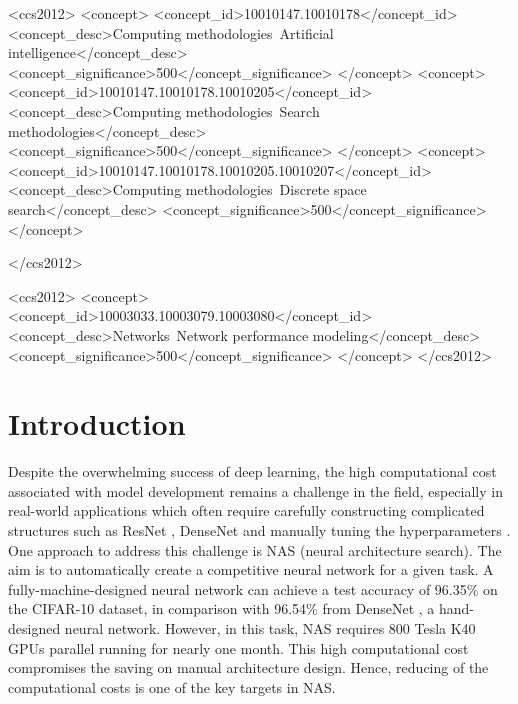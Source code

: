 \documentclass[sigconf]{acmart}
\begin{document}
\begin{CCSXML}
<ccs2012>
<concept>
<concept_id>10010147.10010178</concept_id>
<concept_desc>Computing methodologies~Artificial intelligence</concept_desc>
<concept_significance>500</concept_significance>
</concept>
<concept>
<concept_id>10010147.10010178.10010205</concept_id>
<concept_desc>Computing methodologies~Search methodologies</concept_desc>
<concept_significance>500</concept_significance>
</concept>
<concept>
<concept_id>10010147.10010178.10010205.10010207</concept_id>
<concept_desc>Computing methodologies~Discrete space search</concept_desc>
<concept_significance>500</concept_significance>
</concept>

</ccs2012>
\end{CCSXML}


\begin{CCSXML}
<ccs2012>
<concept>
<concept_id>10003033.10003079.10003080</concept_id>
<concept_desc>Networks~Network performance modeling</concept_desc>
<concept_significance>500</concept_significance>
</concept>
</ccs2012>
\end{CCSXML}



\maketitle

\section{Introduction}

Despite the overwhelming success of deep learning, the high computational cost associated with model development remains a challenge in the field, especially in real-world applications which often require carefully constructing complicated structures such as ResNet \cite{Ref:04}, DenseNet \cite{Ref:47} and manually tuning the hyperparameters \cite{Ref:18,Ref:19,Ref:04,Ref:28,Ref:46}.  One approach to address this challenge is NAS (neural architecture search).  The aim is to automatically create a competitive neural network for a given task.  A fully-machine-designed neural network \cite{Ref:01} can achieve a test accuracy of 96.35\% on the CIFAR-10 dataset, in comparison with 96.54\% from DenseNet \cite{Ref:47}, a hand-designed neural network.  However, in this task, NAS requires 800 Tesla K40 GPUs parallel running for nearly one month.  This high computational cost compromises the saving on manual architecture design.  Hence, reducing of the computational costs is one of the key targets in NAS.
\end{document}
